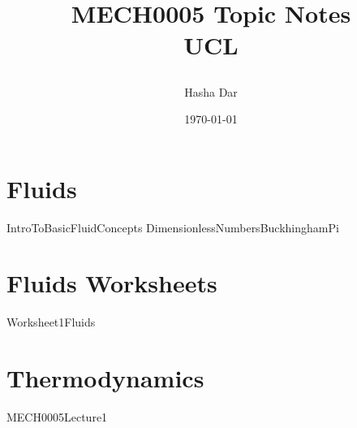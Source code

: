 \documentclass[12pt,a4paper, twoside]{report}
\begin{document}
\title{
  {MECH0005 Topic Notes}\\
  {\large UCL}
  \author{Hasha Dar}
  \date{\today}
}
\maketitle

\tableofcontents
\chapter{Fluids}
{IntroToBasicFluidConcepts}
{DimensionlessNumbersBuckhinghamPi}
\chapter{Fluids Worksheets}
{Worksheet1Fluids}
\chapter{Thermodynamics}
{MECH0005Lecture1}
\end{document}
